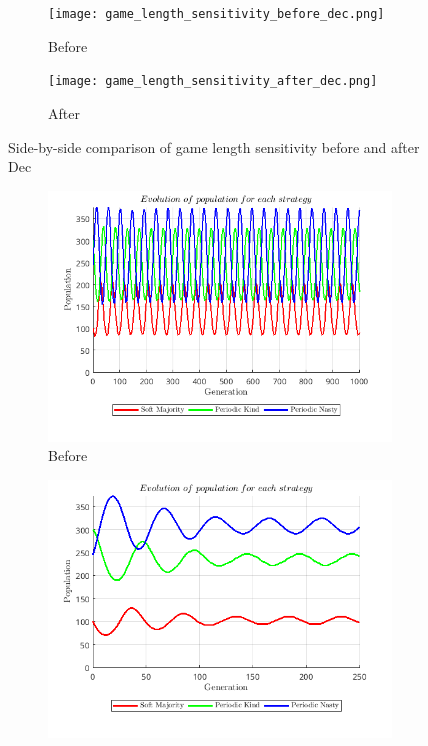 \documentclass[12pt]{report}
\begin{document}
\begin{figure}[H]
    \centering
    \begin{subfigure}[t]{0.45\textwidth}
        \centering
        \texttt{[image: game\_length\_sensitivity\_before\_dec.png]}
        \caption{Before}
    \end{subfigure}
    \hfill
    \begin{subfigure}[t]{0.45\textwidth}
        \centering
        \texttt{[image: game\_length\_sensitivity\_after\_dec.png]}
        \caption{After}
    \end{subfigure}
    \caption{Side-by-side comparison of game length sensitivity before and after Dec}
\end{figure}

\begin{figure}[H]
    \centering
    \begin{subfigure}[t]{0.45\textwidth}
        \centering
        \includegraphics[width=\textwidth]{game_length_sensitivity_before_pop.png}
        \caption{Before}
    \end{subfigure}
    \hfill
    \begin{subfigure}[t]{0.45\textwidth}
        \centering
        \includegraphics[width=\textwidth]{game_length_sensitivity_after_pop.png}

\end{subfigure}
\end{figure}
\end{document}
